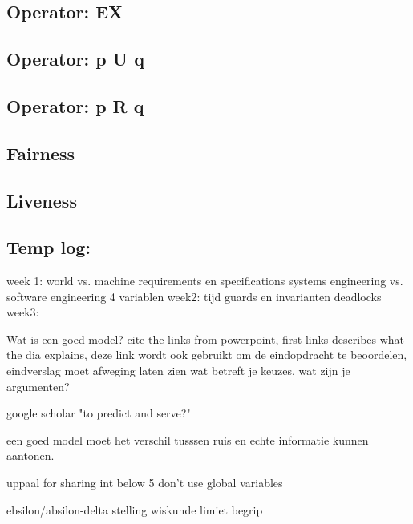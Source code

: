\documentclass{article}
\begin{document}
\subsection{Operator: EX}

\subsection{Operator: p U q}

\subsection{Operator: p R q}

\subsection{Fairness}

\subsection{Liveness}

\newpage
\subsection{Temp log:}
week 1: 
world vs. machine
requirements en specifications
systems engineering vs. software engineering
4 variablen
week2:
tijd
guards en invarianten
deadlocks
week3:

Wat is een goed model? cite the links from powerpoint, first links describes what the dia explains, deze link wordt ook gebruikt om de eindopdracht te beoordelen, eindverslag moet afweging laten zien wat betreft je keuzes, wat zijn je argumenten?

google scholar "to predict and serve?"

een goed model moet het verschil tusssen ruis en echte informatie kunnen aantonen.

uppaal for sharing int below 5 don't use global variables

ebsilon/absilon-delta stelling wiskunde limiet begrip
\newpage


\end{document}
